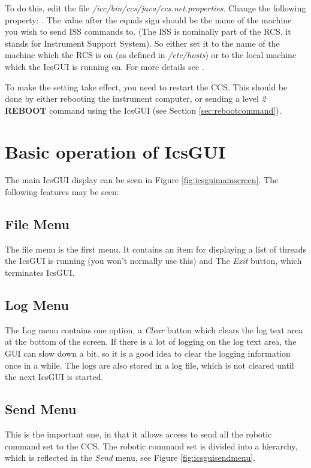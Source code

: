 \documentclass[10pt,a4paper]{article}
\begin{document}
To do this, edit the file {\em /icc/bin/ccs/java/ccs.net.properties}. Change the following property: 
. The value after the equals sign should be the name of the machine you
wish to send ISS commands to. (The ISS is nominally part of the RCS, it stands for Instrument Support System).
So either set it to the name of the machine which the RCS is on (as defined in {\em /etc/hosts}) or to the
local machine which the IcsGUI is running on. For more details see \cite{bib:ccs}.

To make the setting take effect, you need to restart the CCS. This should be done by either rebooting the
instrument computer, or sending a level {\em 2} {\bf REBOOT} command using the IcsGUI 
(see Section \ref{sec:rebootcommand}).

\section{Basic operation of IcsGUI}
The main IcsGUI display can be seen in Figure \ref{fig:icsguimainscreen}. The following features may be seen:

\subsection{File Menu}
The file menu is the first menu. It contains an item for displaying a list of threads the IcsGUI is running
(you won't normally use this) and The {\em Exit} button, which terminates IcsGUI.

\subsection{Log Menu}
The Log menu contains one option, a {\em Clear} button which clears the log text area at the bottom of the screen.
If there is a lot of logging on the log text area, the GUI can slow down a bit, so it is a good idea to clear
the logging information once in a while. The logs are also stored in a log file, which is not cleared until the
next IcsGUI is started.

\subsection{Send Menu}
This is the important one, in that it allows access to send all the robotic command set to the CCS. The robotic
command set is divided into a hierarchy, which is reflected in the {\em Send} menu, see Figure \ref{fig:icsguisendmenu}.
\end{document}
